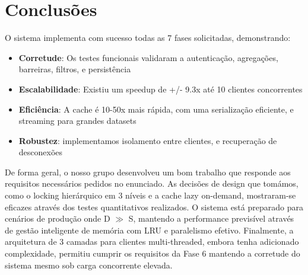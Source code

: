 \documentclass[11pt,a4paper]{article}
\begin{document}
\section{Conclusões}

O sistema implementa com sucesso todas as 7 fases solicitadas, demonstrando:

\begin{itemize}[noitemsep]
    \item \textbf{Corretude}: Os testes funcionais validaram a autenticação, agregações, barreiras, filtros, e persistência
    \item \textbf{Escalabilidade}: Existiu um speedup de +/- 9.3x até 10 clientes concorrentes
    \item \textbf{Eficiência}: A cache é 10-50x mais rápida, com uma serialização eficiente, e streaming para grandes datasets
    \item \textbf{Robustez}: implementamos isolamento entre clientes, e recuperação de desconexões
\end{itemize}

De forma geral, o nosso grupo desenvolveu um bom trabalho que responde aos requisitos necessários pedidos no enunciado. As decisões de design que tomámos, como o locking hierárquico em 3 níveis e a cache lazy on-demand, mostraram-se eficazes através dos testes quantitativos realizados. O sistema está preparado para cenários de produção onde D $\gg$ S, mantendo a performance previsível através de gestão inteligente de memória com LRU e paralelismo efetivo. Finalmente, a arquitetura de 3 camadas para clientes multi-threaded, embora tenha adicionado complexidade, permitiu cumprir os requisitos da Fase 6 mantendo a corretude do sistema mesmo sob carga concorrente elevada.
\end{document}
